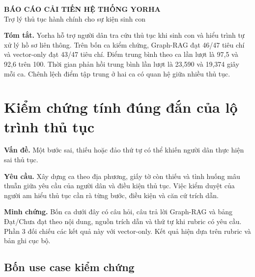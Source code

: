 \documentclass[11pt,a4paper]{article}
\begin{document}
\begin{center}
{\LARGE\bfseries BÁO CÁO CẢI TIẾN HỆ THỐNG YORHA}\\[4pt]
{\large Trợ lý thủ tục hành chính cho sự kiện sinh con}\\[4pt]
\end{center}

\noindent\textbf{Tóm tắt.}
Yorha hỗ trợ người dân tra cứu thủ tục khi sinh con và hiểu trình tự xử lý hồ sơ liên thông. Trên bốn ca kiểm chứng, Graph-RAG đạt 46/47 tiêu chí và vector-only đạt 43/47 tiêu chí. Điểm trung bình theo ca lần lượt là 97,5 và 92,6 trên 100. Thời gian phản hồi trung bình lần lượt là 23,590 và 19,374 giây mỗi ca. Chênh lệch điểm tập trung ở hai ca có quan hệ giữa nhiều thủ tục.

\section{Kiểm chứng tính đúng đắn của lộ trình thủ tục}

\textbf{Vấn đề.} Một bước sai, thiếu hoặc đảo thứ tự có thể khiến người dân thực hiện sai thủ tục.

\textbf{Yêu cầu.} Xây dựng ca theo địa phương, giấy tờ còn thiếu và tình huống mâu thuẫn giữa yêu cầu của người dân và điều kiện thủ tục. Việc kiểm duyệt của người am hiểu thủ tục cần rà từng bước, điều kiện và căn cứ trích dẫn.

\textbf{Minh chứng.} Bốn ca dưới đây có câu hỏi, câu trả lời Graph-RAG và bảng Đạt/Chưa đạt theo nội dung, nguồn trích dẫn và thứ tự khi rubric có yêu cầu. Phần 3 đối chiếu các kết quả này với vector-only. Kết quả hiện dựa trên rubric và bản ghi cục bộ.

\subsection{Bốn use case kiểm chứng}
\end{document}
